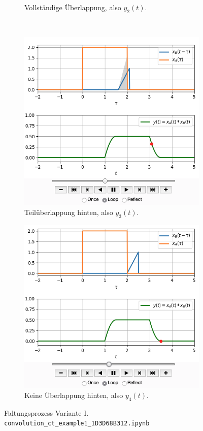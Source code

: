 \documentclass[11pt,a4paper,DIV=12]{scrartcl}
\numberwithin{equation}{section}
\numberwithin{figure}{section}
\begin{document}
\begin{figure}[h!]
\begin{subfigure}{0.45\textwidth}
\caption{Vollständige Überlappung, also $y_2(t)$.}
\label{fig:1D3D68B312_v1_2}
\end{subfigure}
\\
\begin{subfigure}{0.45\textwidth}
\centering
\includegraphics[width=\textwidth]{../convolution_ct/conv_var1_3_1D3D68B312.png}
\caption{Teilüberlappung hinten, also $y_3(t)$.}
\label{fig:1D3D68B312_v1_3}
\end{subfigure}
\begin{subfigure}{0.45\textwidth}
\centering
\includegraphics[width=\textwidth]{../convolution_ct/conv_var1_4_1D3D68B312.png}
\caption{Keine Überlappung hinten, also $y_4(t)$.}
\label{fig:1D3D68B312_v1_4}
\end{subfigure}
%
\caption{Faltungsprozess Variante I.
\texttt{convolution\_ct\_example1\_1D3D68B312.ipynb}}
\label{fig:1D3D68B312_v1}
\end{figure}
\end{document}
